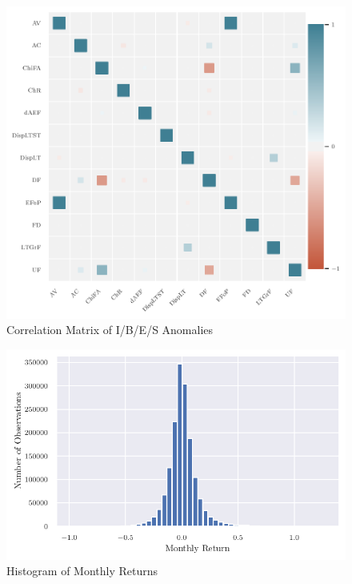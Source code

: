 	
	\begin{center}
		\begin{figure}
			\includegraphics{Figures/corrplot_ibes.pdf}
			\caption{Correlation Matrix of I/B/E/S Anomalies}
			\label{fig:corrplot_ibes}
		\end{figure}
	\end{center}
	
	
	\begin{center}
		\begin{figure}
			\includegraphics{Figures/hist_returns.pdf}
			\caption{Histogram of Monthly Returns}
			\label{fig:hist_returns}
		\end{figure}
	\end{center}


		
	


